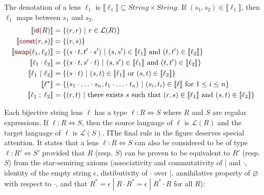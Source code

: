 \documentclass[acmsmall,review,anonymous]{acmart}
\newcommand{\kw}[1]{\textcolor{dkred}{\ensuremath{\mathsf{#1}}}}
\newcommand{\sep}{\ensuremath{\ | \ }}
\newcommand{\const}{\ensuremath{\kw{const}}}
\newcommand{\swap}{\ensuremath{\kw{swap}}}
\newcommand{\id}{\ensuremath{\kw{id}}}
\begin{document}
The denotation of a lens $\ell_1$ is $\llbracket \ell_1 \rrbracket \subseteq
\mathit{String} \times \mathit{String}$. If $(s_1, s_2) \in \llbracket \ell_1
\rrbracket$, then $\ell_1$ maps between $s_1$ and $s_2$.
\begin{align*}
\llbracket \id(R) \rrbracket &= \{(r, r) \sep r \in \mathcal{L}(R)\}\\
\llbracket \const(r, s) \rrbracket &= \{(r, s)\}\\
\llbracket \swap(\ell_1, \ell_2) \rrbracket &= \{(s \cdot t, t' \cdot s') \sep
(s, s') \in \llbracket \ell_1 \rrbracket \text{ and } (t, t') \in \llbracket
\ell_2 \rrbracket\}\\
\llbracket \ell_1 \cdot \ell_2 \rrbracket &= \{(s \cdot t, s' \cdot t) \sep
(s, s') \in \llbracket \ell_1 \rrbracket \text{ and } (t, t') \in \llbracket
\ell_2 \rrbracket\}\\
\llbracket \ell_1 \sep \ell_2 \rrbracket &= \{(s \cdot t) \sep
(s, t) \in \llbracket \ell_1 \rrbracket \text{ or } (s, t) \in \llbracket
\ell_2 \rrbracket\}\\
\llbracket \ell^* \rrbracket &= \{(s_1 \cdot \ldots \cdot s_n, t_1 \cdot \ldots
\cdot t_n) \sep (s_i, t_i) \in \llbracket \ell \rrbracket \text{ for } 1
\leq i \leq n\}\\
\llbracket \ell_1 \; ; \; \ell_2 \rrbracket &= \{(r, t) \sep \text{there exists }s
\text{ such that } (r, s) \in \llbracket \ell_1 \rrbracket \text{ and } (s, t)
\in \llbracket \ell_2 \rrbracket\}
\end{align*}

Each bijective string lens $\ell$ has a type $\ell : R \Leftrightarrow S$ where
$R$ and $S$ are regular expressions. If $\ell : R \Leftrightarrow S$, then the
source language of $\ell$ is $\mathcal{L}(R)$ and the target language of $\ell$
is $\mathcal{L}(S)$. IThe final rule in the figure deserves special attention.
It states that a lens $\ell : R \Leftrightarrow S$ can also be considered to be
of type $\ell : R' \Leftrightarrow S'$ provided that $R$ (resp. $S$) can be
proven to be equivalent to $R'$ (resp. $S$) from the star-semiring axioms
(associativity and commutativity of | and $\cdot$, identity of the empty string
$\epsilon$, distibutivity of $\cdot$ over |, annihilative property of
$\varnothing$ with respect to $\cdot$, and that $R^* = \epsilon \; | \; R \cdot
R^* = \epsilon \; | \; R^* \cdot R$ for all $R$):

\begin{prooftree}
\end{prooftree}
\end{document}
